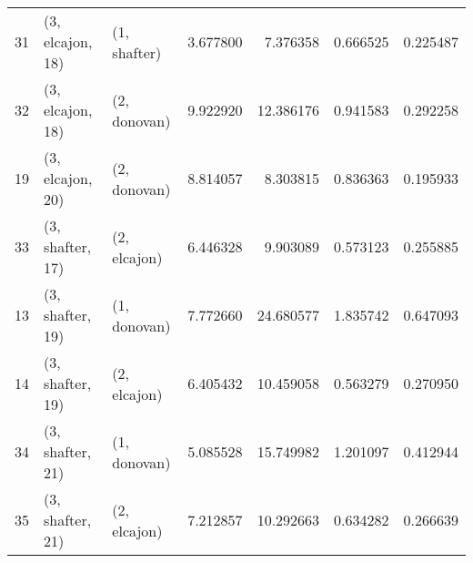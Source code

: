 \begin{tabular}{lllrrrr}
31 &  (3, elcajon, 18) &     (1, shafter) &   3.677800 &   7.376358 &   0.666525 &  0.225487 \\
32 &  (3, elcajon, 18) &     (2, donovan) &   9.922920 &  12.386176 &   0.941583 &  0.292258 \\
19 &  (3, elcajon, 20) &     (2, donovan) &   8.814057 &   8.303815 &   0.836363 &  0.195933 \\
33 &  (3, shafter, 17) &     (2, elcajon) &   6.446328 &   9.903089 &   0.573123 &  0.255885 \\
13 &  (3, shafter, 19) &     (1, donovan) &   7.772660 &  24.680577 &   1.835742 &  0.647093 \\
14 &  (3, shafter, 19) &     (2, elcajon) &   6.405432 &  10.459058 &   0.563279 &  0.270950 \\
34 &  (3, shafter, 21) &     (1, donovan) &   5.085528 &  15.749982 &   1.201097 &  0.412944 \\
35 &  (3, shafter, 21) &     (2, elcajon) &   7.212857 &  10.292663 &   0.634282 &  0.266639 \\
\bottomrule
\end{tabular}
